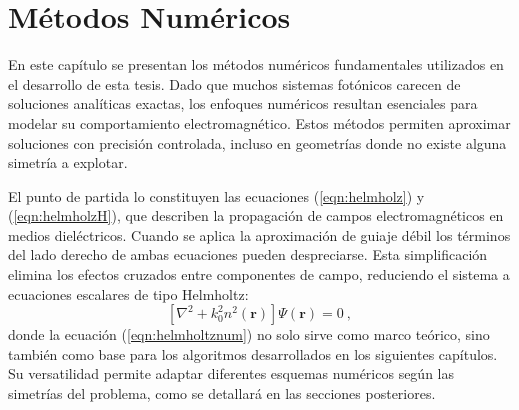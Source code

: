 \chapter{Métodos Numéricos \label{cap:num}}
En este capítulo se presentan los métodos numéricos fundamentales utilizados en el desarrollo de esta tesis. Dado que muchos sistemas fotónicos carecen de soluciones analíticas exactas, los enfoques numéricos resultan esenciales para modelar su comportamiento electromagnético. Estos métodos permiten aproximar soluciones con precisión controlada, incluso en geometrías donde no existe alguna simetría a explotar.

El punto de partida lo constituyen las ecuaciones (\ref{eqn:helmholz}) y (\ref{eqn:helmholzH}), que describen la propagación de campos electromagnéticos en medios dieléctricos. Cuando se aplica la aproximación de guiaje débil los términos del lado derecho de ambas ecuaciones pueden despreciarse. Esta simplificación elimina los efectos cruzados entre componentes de campo, reduciendo el sistema a ecuaciones escalares de tipo Helmholtz:
\begin{equation}
\left[\nabla^2 + k_0^2 n^2(\textbf{r})\right]\Psi(\textbf{r}) = 0 \ , \label{eqn:helmholtznum}
\end{equation}
donde la ecuación (\ref{eqn:helmholtznum}) no solo sirve como marco teórico, sino también como base para los algoritmos desarrollados en los siguientes capítulos. Su versatilidad permite adaptar diferentes esquemas numéricos según las simetrías del problema, como se detallará en las secciones posteriores.
